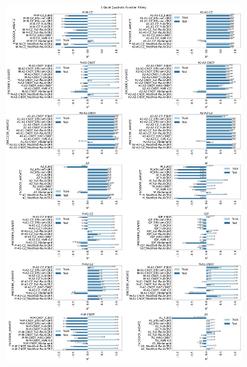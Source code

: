 \documentclass[journal=jacsat,manuscript=article]{achemso}
\begin{document}
\begin{figure}[H]
\begin{subfigure}[b]{\textwidth}
		\includegraphics[width=\textwidth]{images/Function_Fitting/5qubit_Quadratic_funcfit_R2.png}
		\caption{}
		\label{fig:5qubit_Quadratic_funcfit_R2}
	\end{subfigure}
	\hfill
	\begin{subfigure}[b]{\textwidth}
		\centering

\end{subfigure}
\end{figure}
\end{document}
